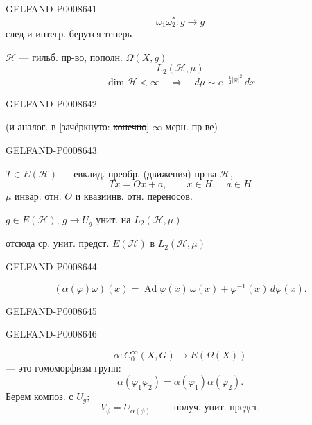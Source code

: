 \begin{GelfandAdjacentEvidence}{GELFAND-P000864}{1}
\[
\omega_1\omega_2^*:g\longrightarrow g
\]
след и интегр. берутся теперь

\(\mathcal H\) — гильб. пр-во, пополн. \(\Omega(X,g)\)
\[
L_2(\mathcal H,\mu)
\]
\[
\dim\mathcal H<\infty\quad\Rightarrow\quad d\mu\sim e^{-\frac12|x|^2}\,dx
\]
\end{GelfandAdjacentEvidence}
\begin{GelfandAdjacentEvidence}{GELFAND-P000864}{2}

(и аналог. в [зачёркнуто: \sout{конечно}] \(\infty\)-мерн. пр-ве)
\end{GelfandAdjacentEvidence}
\begin{GelfandAdjacentEvidence}{GELFAND-P000864}{3}


\(T\in E(\mathcal H)\) — евклид. преобр. (движения) пр-ва \(\mathcal H\),
\[
Tx=Ox+a,\qquad x\in H,\quad a\in H
\]
\(\mu\) инвар. отн. \(O\) и квазиинв. отн. переносов.

\(g\in E(\mathcal H)\), \(g\to U_g\) унит. на \(L_2(\mathcal H,\mu)\)

отсюда ср. унит. предст. \(E(\mathcal H)\) в \(L_2(\mathcal H,\mu)\)
\end{GelfandAdjacentEvidence}
\begin{GelfandAdjacentEvidence}{GELFAND-P000864}{4}

\[
(\alpha(\varphi)\omega)(x)=\operatorname{Ad}\varphi(x)\,\omega(x)
+\varphi^{-1}(x)\,d\varphi(x).\tag{2}
\]
\end{GelfandAdjacentEvidence}
\begin{GelfandAdjacentEvidence}{GELFAND-P000864}{5}

\end{GelfandAdjacentEvidence}
\begin{GelfandAdjacentEvidence}{GELFAND-P000864}{6}

\[
\alpha:C_0^\infty(X,G)\longrightarrow E(\Omega(X))
\]
— это гомоморфизм групп:
\[
\alpha(\varphi_1\varphi_2)=\alpha(\varphi_1)\alpha(\varphi_2).
\]
Берем композ. с \(U_g\);
\[
\underline{\underline{V_\phi=U_{\alpha(\phi)}}}
\quad\text{— получ. унит. предст.}
\]
\end{GelfandAdjacentEvidence}

